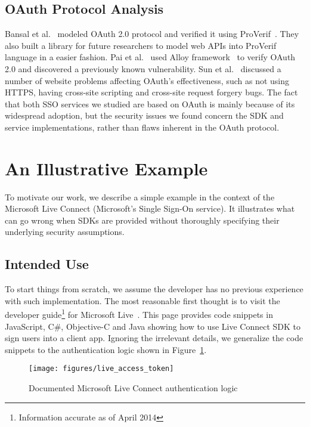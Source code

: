 \subsection{OAuth Protocol Analysis}
Bansal et al.~\cite{6266164} modeled OAuth 2.0 protocol and verified it using ProVerif~\cite{Blanchet:2001:ECP:872752.873511}.  They also built a library for future researchers to model web APIs into ProVerif language in a easier fashion.  Pai et al.~\cite{5966531} used Alloy framework~\cite{Alloy} to verify OAuth 2.0 and discovered a previously known vulnerability.  Sun et al.~\cite{Sun:2012:DDE:2382196.2382238} discussed a number of website problems affecting OAuth’s effectiveness, such as not using HTTPS, having cross-site scripting and cross-site request forgery bugs.  The fact that both SSO services we studied are based on OAuth is mainly because of its widespread adoption, but the security issues we found concern the SDK and service implementations, rather than flaws inherent in the OAuth protocol.  

\section{An Illustrative Example}
\label{sec:explicating_illustrative_example}

To motivate our work, we describe a simple example in the context of the Microsoft Live Connect (Microsoft's Single Sign-On service). It illustrates what can go wrong when SDKs are provided without thoroughly specifying their underlying security assumptions.   

\subsection{Intended Use}

To start things from scratch, we assume the developer has no previous experience with such implementation.  The most reasonable first thought is to visit the developer guide\footnote{Information accurate as of April 2014} for Microsoft Live~\cite{LiveConnectDoc}.  This page provides code snippets in JavaScript, C\#, Objective-C and Java showing how to use Live Connect SDK to sign users into a client app.  Ignoring the irrelevant details, we generalize the code snippets to the authentication logic shown in Figure~\ref{fig:live_access_token}.

\begin{figure}[hbt]
\centering
\texttt{[image: figures/live\_access\_token]}
\caption{Documented Microsoft Live Connect authentication logic}
\label{fig:live_access_token}
\end{figure}

